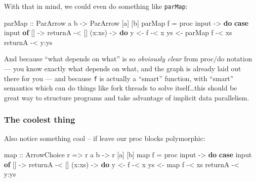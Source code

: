 \documentclass[]{article}
\newenvironment{Shaded}{}{}
\newcommand{\DataTypeTok}[1]{\textcolor[rgb]{0.56,0.13,0.00}{#1}}
\newcommand{\KeywordTok}[1]{\textcolor[rgb]{0.00,0.44,0.13}{\textbf{#1}}}
\newcommand{\NormalTok}[1]{#1}
\newcommand{\OperatorTok}[1]{\textcolor[rgb]{0.40,0.40,0.40}{#1}}
\newcommand{\OtherTok}[1]{\textcolor[rgb]{0.00,0.44,0.13}{#1}}
\begin{document}
With that in mind, we could even do something like \texttt{parMap}:

\begin{Shaded}
\begin{Highlighting}[]
\OtherTok{parMap ::} \DataTypeTok{ParArrow}\NormalTok{ a b }\OtherTok{{-}\textgreater{}} \DataTypeTok{ParArrow}\NormalTok{ [a] [b]}
\NormalTok{parMap f }\OtherTok{=}\NormalTok{ proc input }\OtherTok{{-}\textgreater{}} \KeywordTok{do}
    \KeywordTok{case}\NormalTok{ input }\KeywordTok{of}
\NormalTok{      []     }\OtherTok{{-}\textgreater{}}
\NormalTok{          returnA        }\OperatorTok{{-}\textless{}}\NormalTok{ []}
\NormalTok{      (x}\OperatorTok{:}\NormalTok{xs) }\OtherTok{{-}\textgreater{}} \KeywordTok{do}
\NormalTok{          y  }\OtherTok{\textless{}{-}}\NormalTok{ f        }\OperatorTok{{-}\textless{}}\NormalTok{ x}
\NormalTok{          ys }\OtherTok{\textless{}{-}}\NormalTok{ parMap f }\OperatorTok{{-}\textless{}}\NormalTok{ xs}
\NormalTok{          returnA        }\OperatorTok{{-}\textless{}}\NormalTok{ y}\OperatorTok{:}\NormalTok{ys}
\end{Highlighting}
\end{Shaded}

And because ``what depends on what'' is so \emph{obviously clear} from proc/do
notation --- you know exactly what depends on what, and the graph is already
laid out there for you --- and because \texttt{f} is actually a ``smart''
function, with ``smart'' semantics which can do things like fork threads to
solve itself\ldots this should be great way to structure programs and take
advantage of implicit data parallelism.

\subsubsection{The coolest thing}\label{the-coolest-thing}

Also notice something cool -- if leave our proc blocks polymorphic:

\begin{Shaded}
\begin{Highlighting}[]
\OtherTok{map\textquotesingle{} ::} \DataTypeTok{ArrowChoice}\NormalTok{ r }\OtherTok{=\textgreater{}}\NormalTok{ r a b }\OtherTok{{-}\textgreater{}}\NormalTok{ r [a] [b]}
\NormalTok{map\textquotesingle{} f }\OtherTok{=}\NormalTok{ proc input }\OtherTok{{-}\textgreater{}} \KeywordTok{do}
    \KeywordTok{case}\NormalTok{ input }\KeywordTok{of}
\NormalTok{      []     }\OtherTok{{-}\textgreater{}}
\NormalTok{          returnA        }\OperatorTok{{-}\textless{}}\NormalTok{ []}
\NormalTok{      (x}\OperatorTok{:}\NormalTok{xs) }\OtherTok{{-}\textgreater{}} \KeywordTok{do}
\NormalTok{          y  }\OtherTok{\textless{}{-}}\NormalTok{ f        }\OperatorTok{{-}\textless{}}\NormalTok{ x}
\NormalTok{          ys }\OtherTok{\textless{}{-}}\NormalTok{ map\textquotesingle{} f   }\OperatorTok{{-}\textless{}}\NormalTok{ xs}
\NormalTok{          returnA        }\OperatorTok{{-}\textless{}}\NormalTok{ y}\OperatorTok{:}\NormalTok{ys}
\end{Highlighting}
\end{Shaded}
\end{document}
